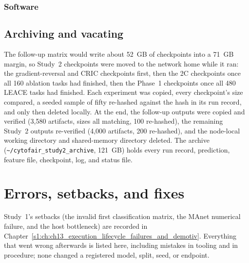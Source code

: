 \subsection{Software}



\section{Archiving and vacating}
\label{r:ch:archive}



The follow-up matrix would write about 52~GB of checkpoints into a 71~GB margin, so Study~2 checkpoints were moved to
the network home while it ran: the gradient-reversal and CRIC checkpoints first, then the 2C checkpoints once all 160
ablation tasks had finished, then the Phase~1 checkpoints once all 480 LEACE tasks had finished. Each experiment was
copied, every checkpoint's size compared, a seeded sample of fifty re-hashed against the hash in its run record, and only
then deleted locally. At the end, the follow-up outputs were copied and verified (3,580 artifacts, sizes all matching,
100 re-hashed), the remaining Study~2 outputs re-verified (4,000 artifacts, 200 re-hashed), and the node-local working
directory and shared-memory directory deleted. The archive (\texttt{\textasciitilde/cytofair\_study2\_archive}, 121~GB)
holds every run record, prediction, feature file, checkpoint, log, and status file.

\chapter{Errors, setbacks, and fixes}
\label{r:ch:errors}

Study~1's setbacks (the invalid first classification matrix, the MAnet numerical failure, and the host bottleneck) are
recorded in Chapter~\ref{s1:ch:ch13_execution_lifecycle_failures_and_demotiv}. Everything that went wrong afterwards is
listed here, including mistakes in tooling and in procedure; none changed a registered model, split, seed, or
endpoint.

